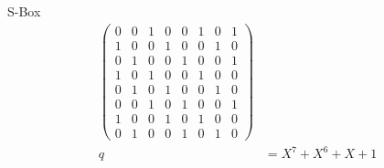 \begin{frame}[t]
\begin{columns}[t,onlytextwidth]
\begin{column}{0.48\textwidth}
{\begin{block}{S-Box}
\begin{align*}
{{\begin{pmatrix}
0&0&1&0&0&1&0&1\\
1&0&0&1&0&0&1&0\\
0&1&0&0&1&0&0&1\\
1&0&1&0&0&1&0&0\\
0&1&0&1&0&0&1&0\\
0&0&1&0&1&0&0&1\\
1&0&0&1&0&1&0&0\\
0&1&0&0&1&0&1&0
\end{pmatrix}}
}
\\
q&=X^7+X^6+X+1
\end{align*}
\end{block}}
\vspace{-10pt}
\end{column}
\end{columns}
\end{frame}
\egroup
